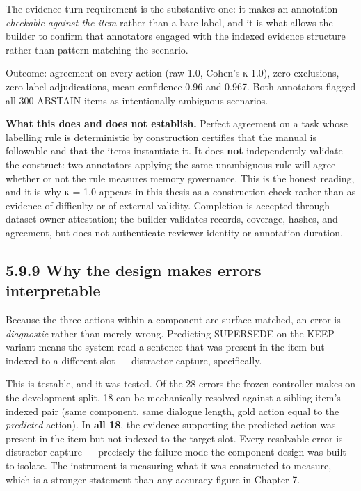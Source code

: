 The evidence-turn requirement is the substantive one: it makes an
annotation \emph{checkable against the item} rather than a bare label,
and it is what allows the builder to confirm that annotators engaged
with the indexed evidence structure rather than pattern-matching the
scenario.

Outcome: agreement on every action (raw 1.0, Cohen's κ 1.0), zero
exclusions, zero label adjudications, mean confidence 0.96 and 0.967.
Both annotators flagged all 300 ABSTAIN items as intentionally ambiguous
scenarios.

\textbf{What this does and does not establish.} Perfect agreement on a
task whose labelling rule is deterministic by construction certifies
that the manual is followable and that the items instantiate it. It does
\textbf{not} independently validate the construct: two annotators
applying the same unambiguous rule will agree whether or not the rule
measures memory governance. This is the honest reading, and it is why κ
= 1.0 appears in this thesis as a construction check rather than as
evidence of difficulty or of external validity. Completion is accepted
through dataset-owner attestation; the builder validates records,
coverage, hashes, and agreement, but does not authenticate reviewer
identity or annotation duration.

\subsection{5.9.9 Why the design makes errors
interpretable}\label{why-the-design-makes-errors-interpretable}

Because the three actions within a component are surface-matched, an
error is \emph{diagnostic} rather than merely wrong. Predicting
SUPERSEDE on the KEEP variant means the system read a sentence that was
present in the item but indexed to a different slot --- distractor
capture, specifically.

This is testable, and it was tested. Of the 28 errors the frozen
controller makes on the development split, 18 can be mechanically
resolved against a sibling item's indexed pair (same component, same
dialogue length, gold action equal to the \emph{predicted} action). In
\textbf{all 18}, the evidence supporting the predicted action was
present in the item but not indexed to the target slot. Every resolvable
error is distractor capture --- precisely the failure mode the component
design was built to isolate. The instrument is measuring what it was
constructed to measure, which is a stronger statement than any accuracy
figure in Chapter 7.


